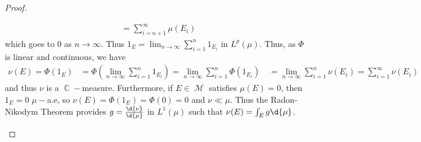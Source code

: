 \documentclass[11pt, a4paper]{memoir}
\DeclareMathOperator{\C}{{\mathbb{C}}}
\theoremstyle{change}
\theoremstyle{plain}
\theoremstyle{nonumberplain}
\newtheorem{proof}{Proof}
\DeclareMathOperator{\M}{{\mathcal{M}}}
\begin{document}
\begin{proof}
\begin{enumerate}[label=(\roman*)]
\begin{align*}
                                                    &= \sum_{i=n+1}^\infty\mu(E_i)
            \end{align*}
            which goes to $0$ as $n\to\infty$.
            Thus $1_E=\lim_{n\to\infty}\sum_{i=1}^n 1_{E_i}$ in $L^p(\mu)$.
            Thus, as $\Phi$ is linear and continuous, we have
            \begin{align*}
                \nu(E)=\Phi(1_E) &= \Phi\left(\lim_{n\to\infty}\sum_{i=1}^n 1_{E_i}\right)=\lim_{n\to\infty}\sum_{i=1}^n\Phi(1_{E_i})\
                                 &= \lim_{n\to\infty}\sum_{i=1}^n\nu(E_i)=\sum_{i=1}^\infty\nu(E_i)
            \end{align*}
            and thus $\nu$ is a $\C-$measure.
            Furthermore, if $E\in\M$ satisfies $\mu(E)=0$, then $1_E=0$ $\mu-$a.e, so $\nu(E)=\Phi(1_E)=\Phi(0)=0$ and $\nu\ll\mu$.
            Thus the Radon-Nikodym Theorem provides $g=\frac{\d{\nu}}{\d{\mu}}$ in $L^1(\mu)$ such that $\nu(E)=\int_E g\d{\mu}$.


\end{enumerate}
\end{proof}
\end{document}
